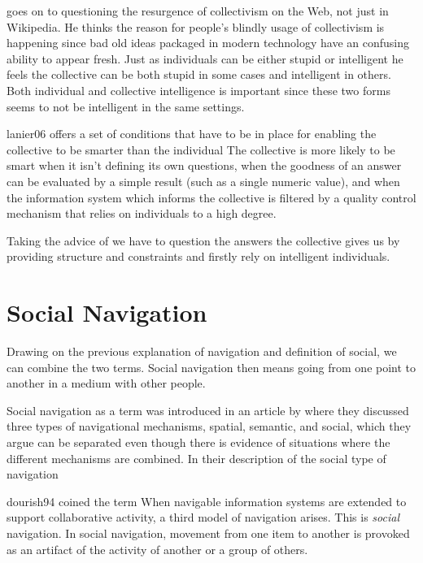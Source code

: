\citet{lanier06} goes on to questioning the resurgence of collectivism on the
Web, not just in Wikipedia.
He thinks the reason for people's blindly usage of collectivism is happening
since bad old ideas packaged in modern technology have an confusing ability to
appear fresh. Just as individuals can be either
stupid or intelligent he feels the collective can be both stupid in some cases
and intelligent in others. Both individual and collective intelligence is
important since these two forms seems to not be intelligent in the same
settings.

\begin{fullquote}{lanier06}{%
  offers a set of conditions that have to be in place for enabling the
  collective to be smarter than the individual}
    The collective is more likely to be smart when it isn't defining its own
    questions, when the goodness of an answer can be evaluated by a simple
    result (such as a single numeric value), and when the information system
    which informs the collective is filtered by a quality control mechanism
    that relies on individuals to a high degree.
\end{fullquote}

Taking the advice of \citeauthor{lanier06} we have to question the answers
the collective gives us by providing structure and constraints and firstly
rely on intelligent individuals.

\section{Social Navigation}
\label{section:social.navigation.social.navigation}

Drawing on the previous explanation of navigation and definition of social, we
can combine the two terms. Social navigation then means going from one point
to another in a medium with other people.

Social navigation as a term was introduced in an article by
\citet{dourish94} where they discussed three types of navigational mechanisms,
spatial, semantic,%
and social, which they argue can be separated even though
there is evidence of situations where the different mechanisms are combined.
In their description of the social type of navigation
\begin{fullquote}[\p{1}]{dourish94}{%
  coined the term }
    When navigable information systems are extended to support collaborative
    activity, a third model of navigation arises. This is \emph{social}
    navigation. In social navigation, movement from one item to another is
    provoked as an artifact of the activity of another or a group of others.
\end{fullquote}

